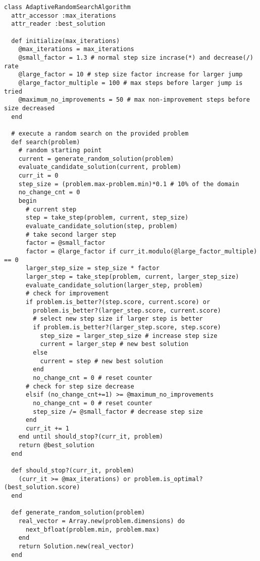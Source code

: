 \begin{lstlisting}
class AdaptiveRandomSearchAlgorithm
  attr_accessor :max_iterations
  attr_reader :best_solution
  
  def initialize(max_iterations)
    @max_iterations = max_iterations
    @small_factor = 1.3 # normal step size incrase(*) and decrease(/) rate
    @large_factor = 10 # step size factor increase for larger jump
    @large_factor_multiple = 100 # max steps before larger jump is tried
    @maximum_no_improvements = 50 # max non-improvement steps before size decreased
  end
  
  # execute a random search on the provided problem
  def search(problem)    
    # random starting point
    current = generate_random_solution(problem)
    evaluate_candidate_solution(current, problem)
    curr_it = 0
    step_size = (problem.max-problem.min)*0.1 # 10% of the domain
    no_change_cnt = 0
    begin
      # current step
      step = take_step(problem, current, step_size)
      evaluate_candidate_solution(step, problem)
      # take second larger step
      factor = @small_factor
      factor = @large_factor if curr_it.modulo(@large_factor_multiple) == 0
      larger_step_size = step_size * factor
      larger_step = take_step(problem, current, larger_step_size)
      evaluate_candidate_solution(larger_step, problem)
      # check for improvement
      if problem.is_better?(step.score, current.score) or 
        problem.is_better?(larger_step.score, current.score)        
        # select new step size if larger step is better
        if problem.is_better?(larger_step.score, step.score)
          step_size = larger_step_size # increase step size
          current = larger_step # new best solution
        else
          current = step # new best solution
        end
        no_change_cnt = 0 # reset counter
      # check for step size decrease
      elsif (no_change_cnt+=1) >= @maximum_no_improvements
        no_change_cnt = 0 # reset counter
        step_size /= @small_factor # decrease step size
      end
      curr_it += 1      
    end until should_stop?(curr_it, problem)
    return @best_solution
  end
  
  def should_stop?(curr_it, problem)
    (curr_it >= @max_iterations) or problem.is_optimal?(best_solution.score)
  end
  
  def generate_random_solution(problem)
    real_vector = Array.new(problem.dimensions) do
      next_bfloat(problem.min, problem.max)
    end
    return Solution.new(real_vector)
  end
  

\end{lstlisting}
